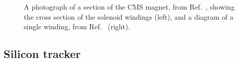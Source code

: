 \begin{figure}[htb]
    \centering
    \quad
    \caption{
        A photograph of a section of the CMS magnet, from Ref.~\cite{CourierSolenoid}, showing the cross section of the solenoid windings (left), and a diagram of a single winding, from Ref.~\cite{CERN-LHCC-97-010} (right). 
    }
    \label{fig:cms_magnet}
\end{figure}

\subsection{Silicon tracker}

